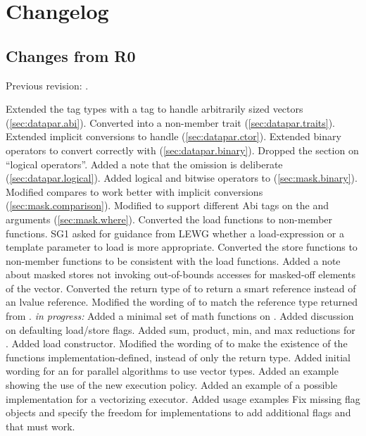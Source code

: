 \section{Changelog}
\subsection{Changes from R0}
Previous revision: \citep{P0214R0}.
\begin{itemize}
  \chck Extended the  tag types with a  tag to handle arbitrarily sized vectors (\ref{sec:datapar.abi}).
  \chck Converted  into a non-member trait (\ref{sec:datapar.traits}).
  \chck Extended implicit conversions to handle \fixedsizeN (\ref{sec:datapar.ctor}).
  \chck Extended binary operators to convert correctly with \fixedsizeN (\ref{sec:datapar.binary}).
  \chck Dropped the section on “\datapar logical operators”. Added a note that the omission is deliberate (\ref{sec:datapar.logical}).
  \chck Added logical and bitwise operators to \mask (\ref{sec:mask.binary}).
  \chck Modified \mask compares to work better with implicit conversions (\ref{sec:mask.comparison}).
  \chck Modified  to support different Abi tags on the \mask and \datapar arguments (\ref{sec:mask.where}).
  \chck Converted the load functions to non-member functions.
    SG1 asked for guidance from LEWG whether a load-expression or a template parameter to load is more appropriate.
  \chck Converted the store functions to non-member functions to be consistent with the load functions.
  \chck Added a note about masked stores not invoking out-of-bounds accesses for masked-off elements of the vector.
  \chck Converted the return type of \datapar{} to return a smart reference instead of an lvalue reference.
  \chck Modified the wording of \mask{} to match the reference type returned from \datapar{}.
  \todo \textit{in progress:} Added a minimal set of math functions on \datapar.
  \todo Added discussion on defaulting load/store flags.
  \todo Added sum, product, min, and max reductions for \datapar.
  \todo Added load constructor.
  \todo Modified the wording of  to make the existence of the functions implementation-defined, instead of only the return type.
  \todo Added initial wording for an  for parallel algorithms to use vector types.
  \todo Added an example showing the use of the new execution policy.
  \todo Added an example of a possible  implementation for a vectorizing executor.
  \todo Added usage examples
  \todo Fix missing flag objects and specify the freedom for implementations to add additional flags and that  must work.
\end{itemize}






